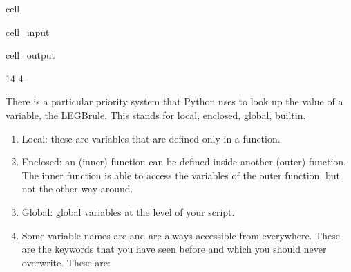 \documentclass[letterpaper,10pt,english]{jupyterBook}
\begin{document}
\begin{sphinxuseclass}{cell}\begin{sphinxVerbatimInput}

\begin{sphinxuseclass}{cell_input}
\begin{sphinxVerbatim}[commandchars=\\\{\}]
  

 
       
    
\end{sphinxVerbatim}

\end{sphinxuseclass}\end{sphinxVerbatimInput}
\begin{sphinxVerbatimOutput}

\begin{sphinxuseclass}{cell_output}
\begin{sphinxVerbatim}[commandchars=\\\{\}]
14
4
\end{sphinxVerbatim}

\end{sphinxuseclass}\end{sphinxVerbatimOutput}

\end{sphinxuseclass}
\sphinxAtStartPar
There is a particular priority system that Python uses to look up the value of a variable, the LEGB\sphinxhyphen{}rule. This stands for local, enclosed, global, built\sphinxhyphen{}in.
\begin{enumerate}
%
\item {} 
\sphinxAtStartPar
Local: these are variables that are defined only in a function.

\item {} 
\sphinxAtStartPar
Enclosed: an (inner) function can be defined inside another (outer) function. The inner function is able to access the variables of the outer function, but not the other way around.

\item {} 
\sphinxAtStartPar
Global: global variables at the level of your script.

\item {} 
\sphinxAtStartPar
Some variable names are  and are always accessible from everywhere. These are the keywords that you have seen before and which you should never overwrite. These are:

\end{enumerate}
\end{document}
